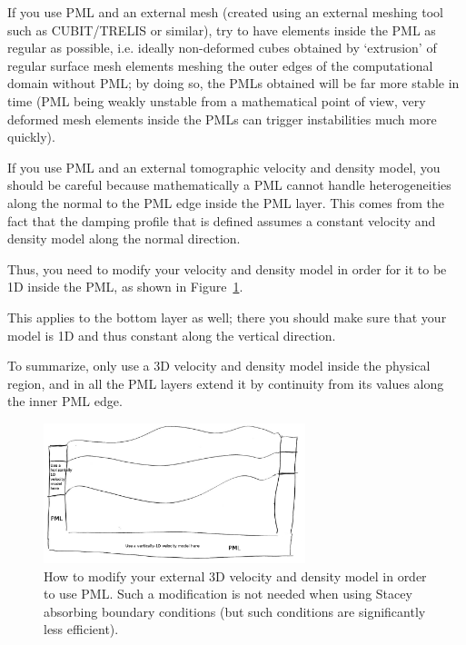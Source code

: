 If you use PML and an external mesh (created using an external meshing tool
such as CUBIT/TRELIS or similar), try to have elements inside the PML as regular as possible,
i.e. ideally non-deformed cubes obtained by `extrusion' of regular surface mesh elements meshing the
outer edges of the computational domain without PML; by doing so, the PMLs obtained will be far more stable
in time (PML being weakly unstable from a mathematical point of view, very deformed mesh elements
inside the PMLs can trigger instabilities much more quickly).

If you use PML and an external tomographic velocity and density model,
you should be careful because mathematically a PML cannot handle heterogeneities
along the normal to the PML edge inside the PML layer. This comes
from the fact that the damping profile that is defined assumes a constant
velocity and density model along the normal direction.

Thus, you need to modify your velocity and density model in order
for it to be 1D inside the PML, as shown in Figure~\ref{fig:modify_external_velocity_model_to_use_PML}.

This applies to the bottom layer as well; there you should make sure
that your model is 1D and thus constant along the vertical direction.

To summarize, only use a 3D velocity and density model inside the
physical region, and in all the PML layers extend it by continuity
from its values along the inner PML edge.

\begin{figure}[htbp]
\noindent \begin{centering}
\includegraphics[width=3in]{figures/how_to_use_PML_when_a_tomographic_velocity_model_is_used.png}
\par\end{centering}

\caption{How to modify your external 3D velocity and density model in order
to use PML. Such a modification is not needed when using Stacey absorbing
boundary conditions (but such conditions are significantly less efficient).}


\label{fig:modify_external_velocity_model_to_use_PML}
\end{figure}


